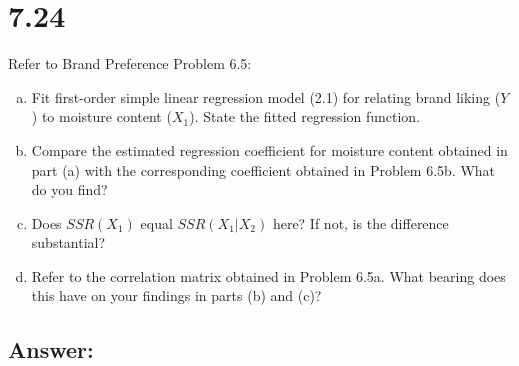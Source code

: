\documentclass{article}
\begin{document}
\section{7.24}

Refer to Brand Preference Problem 6.5:

\begin{enumerate}[a)]
\item{} Fit first-order simple linear regression model (2.1) for relating brand liking ($Y$) to moisture content ($X_1$). State the fitted regression function.
\item{} Compare the estimated regression coefficient for moisture content obtained in part (a) with the corresponding coefficient obtained in Problem 6.5b. What do you find?
\item{} Does $SSR(X_1)$ equal $SSR(X_1|X_2)$ here? If not, is the difference substantial?
\item{} Refer to the correlation matrix obtained in Problem 6.5a. What bearing does this have on your findings in parts (b) and (c)?
\end{enumerate}

\subsection{Answer:}
\end{document}
